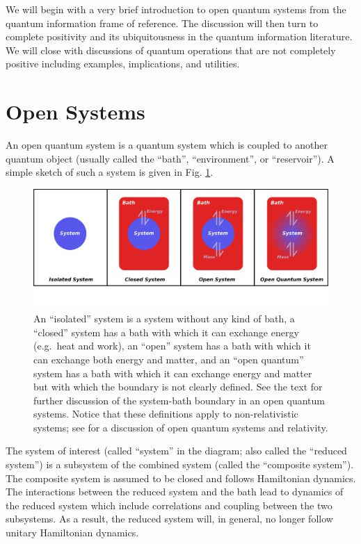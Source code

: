 We will begin with a very brief introduction to open quantum systems from the quantum information frame of reference.  The discussion will then turn to complete positivity and its ubiquitousness in the quantum information literature.  We will close with discussions of quantum operations that are not completely positive including examples, implications, and utilities.  

\section{Open Systems}
An open quantum system is a quantum system which is coupled to another quantum object (usually called the ``bath'', ``environment'', or ``reservoir'').  A simple sketch of such a system is given  in Fig. \ref{fig:sysbathdiagram}.

\begin{figure}[t!]
	\centering
    \includegraphics[scale=0.75]{OpenSystemDiagram.png}
  \caption{An ``isolated'' system is a system without any kind of bath, a ``closed'' system has a bath with which it can exchange energy (e.g.\ heat and work), an ``open'' system has a bath with which it can exchange both energy and matter, and an ``open quantum'' system has a bath with which it can exchange energy and matter but with which the boundary is not clearly defined.  See the text for further discussion of the system-bath boundary in an open quantum systems.  Notice that these definitions apply to non-relativistic systems; see \cite{Breuer2007} for a discussion of open quantum systems and relativity.}
  \label{fig:sysbathdiagram}
\end{figure}

The system of interest (called ``system'' in the diagram; also called the ``reduced system'') is a subsystem of the combined system (called the ``composite system''). The composite system is assumed to be closed and follows Hamiltonian dynamics.  The interactions between the reduced system and the bath lead to dynamics of the reduced system which include correlations and coupling between the two subsystems.  As a result, the reduced system will, in general, no longer follow unitary Hamiltonian dynamics.   

